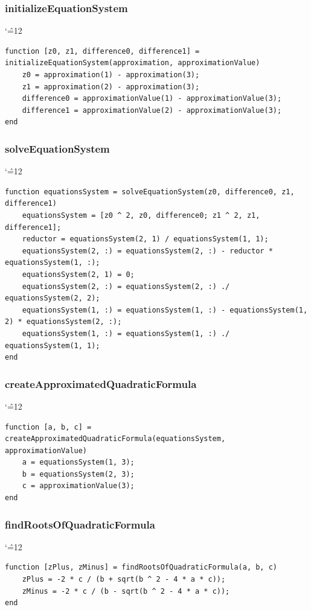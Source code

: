 \documentclass[12pt]{report}
\newenvironment{simplechar}{%
   \catcode`\^=12
}{}
\begin{document}
\subsubsection{initializeEquationSystem}
\begin{simplechar}
\begin{lstlisting}
function [z0, z1, difference0, difference1] = initializeEquationSystem(approximation, approximationValue)
    z0 = approximation(1) - approximation(3);
    z1 = approximation(2) - approximation(3);
    difference0 = approximationValue(1) - approximationValue(3);
    difference1 = approximationValue(2) - approximationValue(3);
end
\end{lstlisting}
\end{simplechar}

\subsubsection{solveEquationSystem}
\begin{simplechar}
\begin{lstlisting}
function equationsSystem = solveEquationSystem(z0, difference0, z1, difference1)
    equationsSystem = [z0 ^ 2, z0, difference0; z1 ^ 2, z1, difference1];
    reductor = equationsSystem(2, 1) / equationsSystem(1, 1);
    equationsSystem(2, :) = equationsSystem(2, :) - reductor * equationsSystem(1, :);
    equationsSystem(2, 1) = 0;
    equationsSystem(2, :) = equationsSystem(2, :) ./ equationsSystem(2, 2);
    equationsSystem(1, :) = equationsSystem(1, :) - equationsSystem(1, 2) * equationsSystem(2, :);
    equationsSystem(1, :) = equationsSystem(1, :) ./ equationsSystem(1, 1);
end
\end{lstlisting}
\end{simplechar}

\newpage
\subsubsection{createApproximatedQuadraticFormula}
\begin{simplechar}
\begin{lstlisting}
function [a, b, c] = createApproximatedQuadraticFormula(equationsSystem, approximationValue)
    a = equationsSystem(1, 3);
    b = equationsSystem(2, 3);
    c = approximationValue(3);
end
\end{lstlisting}
\end{simplechar}

\subsubsection{findRootsOfQuadraticFormula}
\begin{simplechar}
\begin{lstlisting}
function [zPlus, zMinus] = findRootsOfQuadraticFormula(a, b, c)
    zPlus = -2 * c / (b + sqrt(b ^ 2 - 4 * a * c));
    zMinus = -2 * c / (b - sqrt(b ^ 2 - 4 * a * c));
end
\end{lstlisting}
\end{simplechar}
\end{document}
